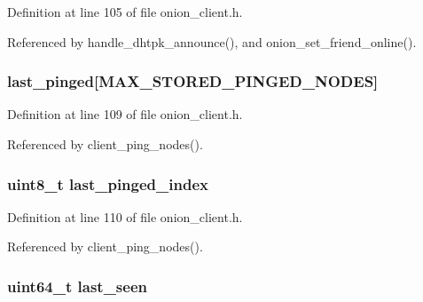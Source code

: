 Definition at line 105 of file onion\+\_\+client.\+h.



Referenced by handle\+\_\+dhtpk\+\_\+announce(), and onion\+\_\+set\+\_\+friend\+\_\+online().

\hypertarget{struct_onion___friend_a27015cced65360814a59652b662ef143}{
\subsubsection[{last\+\_\+pinged}]{ last\+\_\+pinged\mbox{[}{\bf M\+A\+X\+\_\+\+S\+T\+O\+R\+E\+D\+\_\+\+P\+I\+N\+G\+E\+D\+\_\+\+N\+O\+D\+E\+S}\mbox{]}}}\label{struct_onion___friend_a27015cced65360814a59652b662ef143}


Definition at line 109 of file onion\+\_\+client.\+h.



Referenced by client\+\_\+ping\+\_\+nodes().

\hypertarget{struct_onion___friend_a6e0a5214a3dffa151dd52dc4c230145b}{
\subsubsection[{last\+\_\+pinged\+\_\+index}]{\setlength{\rightskip}{0pt plus 5cm}uint8\+\_\+t last\+\_\+pinged\+\_\+index}}\label{struct_onion___friend_a6e0a5214a3dffa151dd52dc4c230145b}


Definition at line 110 of file onion\+\_\+client.\+h.



Referenced by client\+\_\+ping\+\_\+nodes().

\hypertarget{struct_onion___friend_a7418e248decb1dc63d1e1c8960092c33}{
\subsubsection[{last\+\_\+seen}]{\setlength{\rightskip}{0pt plus 5cm}uint64\+\_\+t last\+\_\+seen}}\label{struct_onion___friend_a7418e248decb1dc63d1e1c8960092c33}


